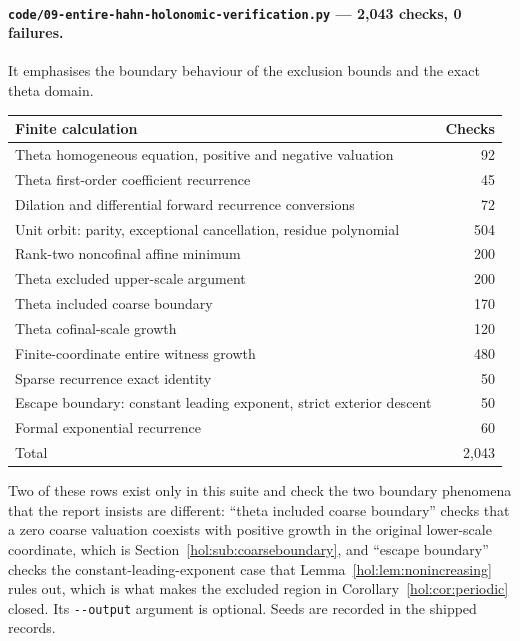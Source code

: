 \documentclass[11pt]{article}
\numberwithin{equation}{section}
\theoremstyle{definition}
\theoremstyle{remark}
\begin{document}
\paragraph{\texttt{code/09-entire-hahn-holonomic-verification.py} --- 2{,}043
checks, 0 failures.}
It emphasises the boundary behaviour of the exclusion bounds and the exact
theta domain.
\begin{center}
\begin{tabularx}{\textwidth}{@{}X r@{}}
\toprule
Finite calculation & Checks\\
\midrule
Theta homogeneous equation, positive and negative valuation & 92\\
Theta first-order coefficient recurrence & 45\\
Dilation and differential forward recurrence conversions & 72\\
Unit orbit: parity, exceptional cancellation, residue polynomial & 504\\
Rank-two noncofinal affine minimum & 200\\
Theta excluded upper-scale argument & 200\\
Theta included coarse boundary & 170\\
Theta cofinal-scale growth & 120\\
Finite-coordinate entire witness growth & 480\\
Sparse recurrence exact identity & 50\\
Escape boundary: constant leading exponent, strict exterior descent & 50\\
Formal exponential recurrence & 60\\
\midrule
Total & 2{,}043\\
\bottomrule
\end{tabularx}
\end{center}
Two of these rows exist only in this suite and check the two boundary
phenomena that the report insists are different: ``theta included coarse
boundary'' checks that a zero coarse valuation coexists with positive growth
in the original lower-scale coordinate, which is
Section~\ref{hol:sub:coarseboundary}, and ``escape boundary'' checks the
constant-leading-exponent case that
Lemma~\ref{hol:lem:nonincreasing} rules out, which is what makes the excluded
region in Corollary~\ref{hol:cor:periodic} closed. Its \verb|--output|
argument is optional. Seeds are recorded in the shipped records.
\end{document}
